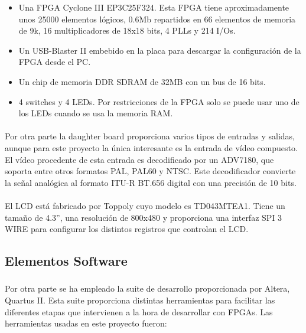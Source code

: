 \documentclass[a4paper,12pt,titlepage,final]{book}
\begin{document}
\begin{itemize}
\item Una FPGA Cyclone III EP3C25F324. Esta FPGA tiene aproximadamente unos 25000 elementos lógicos, 0.6Mb repartidos en 66 elementos de memoria de 9k, 16 multiplicadores de 18x18 bits, 4 PLLs y 214 I/Os.

\item Un USB-Blaster II embebido en la placa para descargar la configuración de la FPGA desde el PC.

\item Un chip de memoria DDR SDRAM de 32MB con un bus de 16 bits.

\item 4 switches y 4 LEDs. Por restricciones de la FPGA solo se puede usar uno de los LEDs cuando se usa la memoria RAM.
\end{itemize}

\paragraph{}
Por otra parte la daughter board proporciona varios tipos de entradas y salidas, aunque para este proyecto la única interesante es la entrada de vídeo compuesto. El vídeo procedente de esta entrada es decodificado por un ADV7180, que soporta entre otros formatos PAL, PAL60 y NTSC. Este decodificador convierte  la señal analógica al formato ITU-R BT.656 digital con una precisión de 10 bits.

\paragraph{}
El LCD está fabricado por Toppoly cuyo modelo es TD043MTEA1. Tiene un tamaño de
4.3”, una resolución de 800x480 y proporciona una interfaz SPI 3 WIRE para
configurar los distintos registros que controlan el LCD.

\subsection{Elementos Software}
\subsubsection*{}

\paragraph{}
Por otra parte se ha empleado la suite de desarrollo proporcionada por Altera,
Quartus II. Esta suite proporciona distintas herramientas para facilitar las
diferentes etapas que intervienen a la hora de desarrollar con FPGAs. Las
herramientas usadas en este proyecto fueron:
\end{document}
